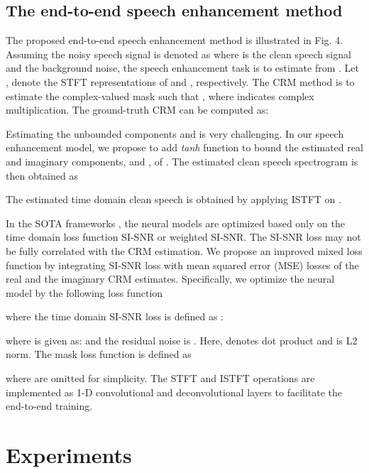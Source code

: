 \documentclass{article}
\begin{document}
\subsection{The end-to-end speech enhancement method}
The proposed end-to-end speech enhancement method is illustrated in Fig. 4. Assuming the noisy speech signal is denoted as  where  is the clean speech signal and  the background noise, the speech enhancement task is to estimate  from . Let ,  denote the STFT representations of  and , respectively. The CRM method \cite{Williamson2015} is to estimate the complex-valued mask  such that , where  indicates complex multiplication. The ground-truth CRM can be computed as:

Estimating the unbounded components  and  is very challenging. In our speech enhancement model, we propose to add {\it tanh} function to bound the estimated real and imaginary components,  and , of . The estimated clean speech spectrogram  is then obtained as

The estimated time domain clean speech  is obtained by applying ISTFT on .

In the SOTA frameworks \cite{Choi2019, Hu2020}, the neural models are optimized based only on the time domain loss function SI-SNR or weighted SI-SNR. The SI-SNR loss may not be fully correlated with the CRM estimation. We propose an improved mixed loss function by integrating SI-SNR loss with mean squared error (MSE) losses of the real and the imaginary CRM estimates. Specifically, we optimize the neural model by the following loss function

where the time domain SI-SNR loss  is defined as \cite{Hu2020}:

where  is given as:  and the residual noise  is  . Here,  denotes dot product and  is L2 norm.
The mask loss function is defined as

where  are omitted for simplicity.
The STFT and ISTFT operations are implemented
as 1-D convolutional and deconvolutional layers to facilitate the end-to-end training.
\section{Experiments}
\label{sec:typestyle}
\end{document}
